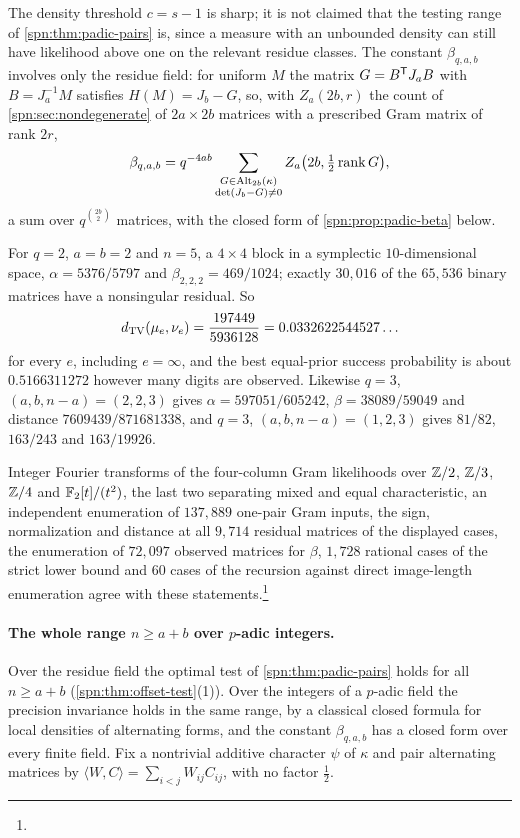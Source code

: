The density threshold $c=s-1$ is sharp; it is not claimed that the testing range of
\cref{spn:thm:padic-pairs} is, since a measure with an unbounded density can still have likelihood
above one on the relevant residue classes. The constant $\beta_{q,a,b}$ involves only the residue
field: for uniform $M$ the matrix $G=B^{\mathsf{T}}J_aB$ with $B=J_a^{-1}M$ satisfies $H(M)=J_b-G$, so,
with $Z_a(2b,r)$ the count of \cref{spn:sec:nondegenerate} of $2a\times2b$ matrices with a prescribed
Gram matrix of rank $2r$,
\[
 \beta_{q,a,b}=q^{-4ab}\sum_{\substack{G\in\operatorname{Alt}_{2b}(\kappa)\\ \det(J_b-G)\ne0}}Z_a\bigl(2b,\tfrac12\operatorname{rank} G\bigr),
\]
a sum over $q^{\binom{2b}2}$ matrices, with the closed form of \cref{spn:prop:padic-beta} below.

\begin{example}\label{spn:ex:padic-pairs}
For $q=2$, $a=b=2$ and $n=5$, a $4\times4$ block in a symplectic $10$-dimensional space,
$\alpha=5376/5797$ and $\beta_{2,2,2}=469/1024$; exactly $30{,}016$ of the $65{,}536$ binary matrices
have a nonsingular residual. So
\[
 d_{\mathrm{TV}}(\mu_e,\nu_e)=\frac{197449}{5936128}=0.0332622544527\ldots
\]
for every $e$, including $e=\infty$, and the best equal-prior success probability is about
$0.5166311272$ however many digits are observed. Likewise $q=3$, $(a,b,n-a)=(2,2,3)$ gives
$\alpha=597051/605242$, $\beta=38089/59049$ and distance $7609439/871681338$, and $q=3$,
$(a,b,n-a)=(1,2,3)$ gives $81/82$, $163/243$ and $163/19926$.
\end{example}

Integer Fourier transforms of the four-column Gram likelihoods over $\mathbb{Z}/2$, $\mathbb{Z}/3$, $\mathbb{Z}/4$ and
$\mathbb{F}_2[t]/(t^2)$, the last two separating mixed and equal characteristic, an independent enumeration
of $137{,}889$ one-pair Gram inputs, the sign, normalization and distance at all $9{,}714$ residual
matrices of the displayed cases, the enumeration of $72{,}097$ observed matrices for $\beta$, $1{,}728$
rational cases of the strict lower bound and $60$ cases of the recursion against direct image-length
enumeration agree with these
statements.\footnote{}

\paragraph{The whole range $n\ge a+b$ over $p$-adic integers.}
Over the residue field the optimal test of \cref{spn:thm:padic-pairs} holds for all $n\ge a+b$
(\cref{spn:thm:offset-test}(1)). Over the integers of a $p$-adic field the precision invariance holds
in the same range, by a classical closed formula for local densities of alternating forms, and the
constant $\beta_{q,a,b}$ has a closed form over every finite field. Fix a nontrivial additive
character $\psi$ of $\kappa$ and pair alternating matrices by $\langle W,C\rangle=\sum_{i<j}W_{ij}C_{ij}$,
with no factor $\frac12$.

